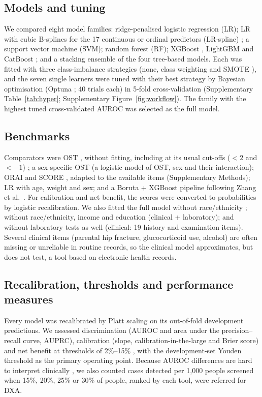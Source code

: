\documentclass[11pt,a4paper]{article}
\begin{document}
\subsection{Models and tuning}
We compared eight model families: ridge-penalised logistic regression (LR); LR with cubic B-splines for the 17 continuous or ordinal predictors (LR-spline) \cite{perperoglou2019}; a support vector machine (SVM); random forest (RF); XGBoost \cite{chen2016}, LightGBM \cite{ke2017} and CatBoost \cite{prokhorenkova2018}; and a stacking ensemble of the four tree-based models. Each was fitted with three class-imbalance strategies (none, class weighting and SMOTE \cite{chawla2002}), and the seven single learners were tuned with their best strategy by Bayesian optimisation (Optuna \cite{akiba2019}; 40 trials each) in 5-fold cross-validation (Supplementary Table~\ref{tab:hyper}; Supplementary Figure~\ref{fig:workflow}). The family with the highest tuned cross-validated AUROC was selected as the full model.

\subsection{Benchmarks}
Comparators were OST \cite{geusens2002}, without fitting, including at its usual cut-offs ($<2$ and $<-1$) \cite{rud2007}; a sex-specific OST (a logistic model of OST, sex and their interaction); ORAI \cite{cadarette2000} and SCORE \cite{lydick1998}, adapted to the available items (Supplementary Methods); LR with age, weight and sex; and a Boruta + XGBoost pipeline following Zhang et al.\ \cite{zhang2025,kursa2010}. For calibration and net benefit, the scores were converted to probabilities by logistic recalibration. We also fitted the full model without race/ethnicity \cite{vyas2020}; without race/ethnicity, income and education (clinical + laboratory); and without laboratory tests as well (clinical: 19 history and examination items). Several clinical items (parental hip fracture, glucocorticoid use, alcohol) are often missing or unreliable in routine records, so the clinical model approximates, but does not test, a tool based on electronic health records.

\subsection{Recalibration, thresholds and performance measures}
Every model was recalibrated by Platt scaling \cite{platt2000} on its out-of-fold development predictions. We assessed discrimination (AUROC and area under the precision--recall curve, AUPRC), calibration (slope, calibration-in-the-large and Brier score) \cite{vancalster2019} and net benefit at thresholds of 2\%--15\% \cite{vickers2006}, with the development-set Youden threshold \cite{youden1950} as the primary operating point. Because AUROC differences are hard to interpret clinically \cite{dehond2022}, we also counted cases detected per 1,000 people screened when 15\%, 20\%, 25\% or 30\% of people, ranked by each tool, were referred for DXA.
\end{document}
